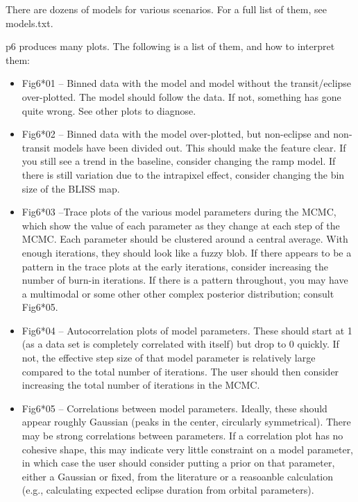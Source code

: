 \documentclass[letterpaper,12pt]{article}
\begin{document}
There are dozens of models for various scenarios. For a full list of them,
see models.txt.

p6 produces many plots. The following is a list of them, and how to interpret
them:

\begin{itemize}
\item Fig6*01 -- Binned data with the model and model without the
  transit/eclipse over-plotted. The model should follow the data. If not,
  something has gone quite wrong. See other plots to diagnose.

\item Fig6*02 -- Binned data with the model over-plotted, but non-eclipse
  and non-transit models have been divided out. This should make the
  feature clear. If you still see a trend in the baseline, consider changing
  the ramp model. If there is still variation due to the intrapixel effect,
  consider changing the bin size of the BLISS map.

\item Fig6*03 --Trace plots of the various model parameters during the
  MCMC, which show the value of each parameter as they change at each
  step of the MCMC. Each parameter should be clustered around a
  central average. With enough iterations, they should look like a
  fuzzy blob. If there appears to be a pattern in the trace plots at
  the early iterations, consider increasing the number of burn-in
  iterations. If there is a pattern throughout, you may have a
  multimodal or some other other complex posterior distribution;
  consult Fig6*05.

\item Fig6*04 -- Autocorrelation plots of model parameters. These should
  start at 1 (as a data set is completely correlated with itself) but drop
  to 0 quickly. If not, the effective step size of that model parameter
  is relatively large compared to the total number of iterations. The user
  should then consider increasing the total number of iterations in the
  MCMC.

\item Fig6*05 -- Correlations between model parameters. Ideally, these
  should appear roughly Gaussian (peaks in the center, circularly
  symmetrical).  There may be strong correlations between
  parameters. If a correlation plot has no cohesive shape, this may
  indicate very little constraint on a model parameter, in which case
  the user should consider putting a prior on that parameter, either a
  Gaussian or fixed, from the literature or a reasoanble calculation
  (e.g., calculating expected eclipse duration from orbital
  parameters).


\end{itemize}
\end{document}
